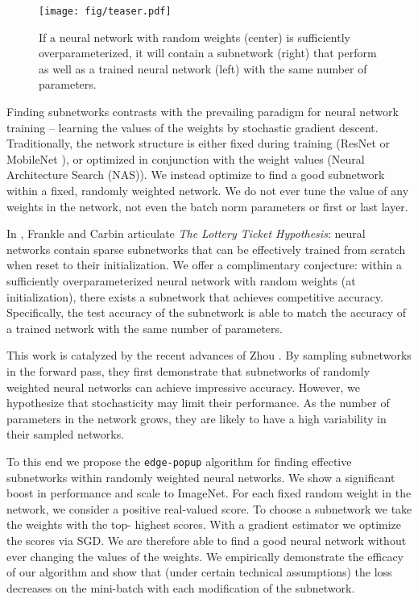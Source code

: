 \documentclass[10pt,twocolumn,letterpaper]{article}
\newcommand{\alg}{\texttt{edge-popup} }
\begin{document}
\begin{figure}[t]
\begin{center}
\texttt{[image: fig/teaser.pdf]}
\end{center}
  \caption{If a neural network with random weights (center) is sufficiently overparameterized, it will contain a subnetwork (right) that perform as well as a trained neural network (left) with the same number of parameters.}

\label{fig:teaser}
\end{figure}
Finding subnetworks contrasts with the prevailing paradigm for neural network training -- learning the values of the weights by stochastic gradient descent. Traditionally, the network structure is either fixed during training (\eg ResNet \cite{resnet} or MobileNet \cite{mobilenet}), or optimized in conjunction with the weight values (\eg Neural Architecture Search (NAS)). We instead optimize to find a good subnetwork within a fixed, randomly weighted network. We do not ever tune the value of any weights in the network, not even the batch norm \cite{batchnorm} parameters or first or last layer.


In \cite{lth}, Frankle and Carbin articulate \textit{The Lottery Ticket Hypothesis}: neural networks contain sparse subnetworks that can be effectively trained from scratch when reset to their initialization.
We offer a complimentary conjecture: within a sufficiently overparameterized neural network with random weights (\eg at initialization), there exists a subnetwork that achieves competitive accuracy. 
Specifically, the test accuracy of the subnetwork is able to match the accuracy of a trained network with the same number of parameters. 

This work is catalyzed by the recent advances of Zhou \etal \cite{supermask}. By sampling subnetworks in the forward pass, they first demonstrate that subnetworks of randomly weighted neural networks can achieve impressive accuracy. However, we hypothesize that stochasticity may limit their performance. As the number of parameters in the network grows, they are likely to have a high variability in their sampled networks.

To this end we propose the \alg algorithm for finding effective subnetworks within randomly weighted neural networks. We show a significant boost in performance and scale to ImageNet. For each fixed random weight in the network, we consider a positive real-valued score. To choose a subnetwork we take the weights with the top- highest scores. With a gradient estimator we optimize the scores via SGD. We are therefore able to find a good neural network without ever changing the values of the weights. We empirically demonstrate the efficacy of our algorithm and show that (under certain technical assumptions) the loss decreases on the mini-batch with each modification of the subnetwork.
\end{document}
